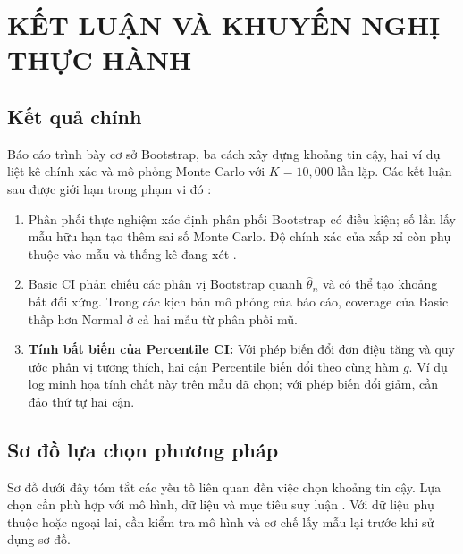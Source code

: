 	\section{KẾT LUẬN VÀ KHUYẾN NGHỊ THỰC HÀNH}
	
	\subsection{Kết quả chính}
	
	Báo cáo trình bày cơ sở Bootstrap, ba cách xây dựng khoảng tin cậy, hai ví dụ liệt kê chính xác và mô phỏng Monte Carlo với $K=10{,}000$ lần lặp. Các kết luận sau được giới hạn trong phạm vi đó \cite{buithuytrang2026, efron1993, davison1997}:
	
	\begin{enumerate}
		\item Phân phối thực nghiệm xác định phân phối Bootstrap có điều kiện; số lần lấy mẫu hữu hạn tạo thêm sai số Monte Carlo. Độ chính xác của xấp xỉ còn phụ thuộc vào mẫu và thống kê đang xét \cite{efron1993}.
		\item Basic CI phản chiếu các phân vị Bootstrap quanh $\hat{\theta}_n$ và có thể tạo khoảng bất đối xứng. Trong các kịch bản mô phỏng của báo cáo, coverage của Basic thấp hơn Normal ở cả hai mẫu từ phân phối mũ.
		\item \textbf{Tính bất biến của Percentile CI:} Với phép biến đổi đơn điệu tăng và quy ước phân vị tương thích, hai cận Percentile biến đổi theo cùng hàm $g$. Ví dụ log minh họa tính chất này trên mẫu đã chọn; với phép biến đổi giảm, cần đảo thứ tự hai cận.
	\end{enumerate}
	
	\subsection{Sơ đồ lựa chọn phương pháp}
	
	Sơ đồ dưới đây tóm tắt các yếu tố liên quan đến việc chọn khoảng tin cậy. Lựa chọn cần phù hợp với mô hình, dữ liệu và mục tiêu suy luận \cite{efron1993, davison1997}. Với dữ liệu phụ thuộc hoặc ngoại lai, cần kiểm tra mô hình và cơ chế lấy mẫu lại trước khi sử dụng sơ đồ.
	
